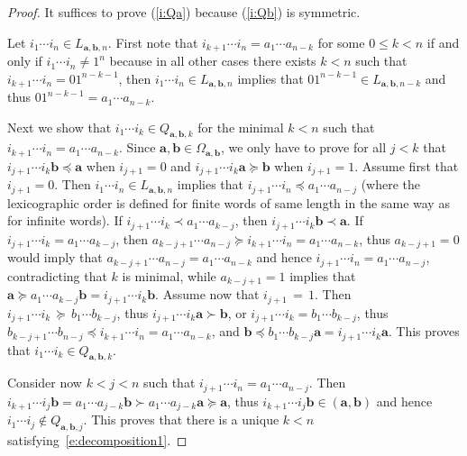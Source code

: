 \documentclass{amsart}
\theoremstyle{definition}
\numberwithin{equation}{section}
\newcommand{\ba}{\mathbf{a}}
\newcommand{\bb}{\mathbf{b}}
\begin{document}
\begin{proof}
It suffices to prove (\ref{i:Qa}) because (\ref{i:Qb}) is symmetric. 

Let $i_1 \cdots i_n \in L_{\ba,\bb,n}$. 
First note that $i_{k+1} \cdots i_n = a_1 \cdots a_{n-k}$ for some $0 \le k < n$ if and only if $i_1 \cdots i_n \ne 1^n$ because in all other cases there exists $k < n$ such that $i_{k+1} \cdots i_n = 01^{n-k-1}$, then $i_1 \cdots i_n \in L_{\ba,\bb,n}$ implies that $01^{n-k-1} \in L_{\ba,\bb,n-k}$ and thus $01^{n-k-1}  = a_1 \cdots a_{n-k}$.

Next we show that $i_1 \cdots i_k \in Q_{\ba,\bb,k}$ for the minimal $k < n$ such that $i_{k+1} \cdots i_n = a_1 \cdots a_{n-k}$.
Since $\ba, \bb \in \Omega_{\ba,\bb}$, we only have to prove for all $j < k$ that $i_{j+1} \cdots i_k \bb \preceq \ba$ when $i_{j+1} = 0$ and $i_{j+1} \cdots i_k \ba \succeq \bb$ when $i_{j+1} = 1$. 
Assume first that $i_{j+1} = 0$. 
Then $i_1 \cdots i_n \in L_{\ba,\bb,n}$ implies that $i_{j+1}\cdots i_n \preceq a_1 \cdots a_{n-j}$ (where the lexicographic order is defined for finite words of same length in the same way as for infinite words). 
If $i_{j+1} \cdots i_k \prec a_1 \cdots a_{k-j}$, then $i_{j+1} \cdots i_k \bb \prec \ba$.
If $i_{j+1} \cdots i_k = a_1 \cdots a_{k-j}$, then $a_{k-j+1} \cdots a_{n-j} \succeq i_{k+1} \cdots i_n = a_1 \cdots a_{n-k}$, thus $a_{k-j+1} = 0$ would imply that $a_{k-j+1} \cdots a_{n-j} = a_1 \cdots a_{n-k}$ and hence $i_{j+1} \cdots i_n = a_1 \cdots a_{n-j}$, contradicting that $k$ is minimal, while $a_{k-j+1} = 1$ implies that $\ba \succeq a_1 \cdots a_{k-j} \bb =  i_{j+1} \cdots i_k \bb$.
Assume now that $i_{j+1} {\,=\,} 1$.
Then $i_{j+1} \cdots i_k {\,\succeq\,} b_1 \cdots b_{k-j}$, thus $i_{j+1} \cdots i_k \ba \succ \bb$, or $i_{j+1} \cdots i_k = b_1 \cdots b_{k-j}$, thus $b_{k-j+1} \cdots b_{n-j} \preceq i_{k+1} \cdots i_n = a_1 \cdots a_{n-k}$, and $\bb \preceq b_1 \cdots b_{k-j} \ba = i_{j+1} \cdots i_k \ba$. 
This proves that $i_1 \cdots i_k \in Q_{\ba,\bb,k}$.

Consider now $k < j < n$ such that $i_{j+1} \cdots i_n = a_1 \cdots a_{n-j}$. 
Then $i_{k+1} \cdots i_j \bb = a_1 \cdots a_{j-k} \bb \succ a_1 \cdots a_{j-k} \ba \succeq \ba$, thus $i_{k+1} \cdots i_j \bb \in (\ba,\bb)$ and hence $i_1 \cdots i_j \notin Q_{\ba,\bb,j}$.
This proves that there is a unique $k < n$ satisfying~\eqref{e:decomposition1}.
\end{proof}
\end{document}
